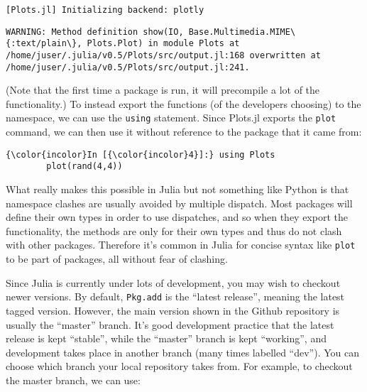 \documentclass[11pt]{article}
\begin{document}
    
    
    \begin{Verbatim}[commandchars=\\\{\}]
[Plots.jl] Initializing backend: plotly

    \end{Verbatim}

    \begin{Verbatim}[commandchars=\\\{\}]
WARNING: Method definition show(IO, Base.Multimedia.MIME\{:text/plain\}, Plots.Plot) in module Plots at /home/juser/.julia/v0.5/Plots/src/output.jl:168 overwritten at /home/juser/.julia/v0.5/Plots/src/output.jl:241.

    \end{Verbatim}

    (Note that the first time a package is run, it will precompile a lot of
the functionality.) To instead export the functions (of the developers
choosing) to the namespace, we can use the \texttt{using} statement.
Since Plots.jl exports the \texttt{plot} command, we can then use it
without reference to the package that it came from:

    \begin{Verbatim}[commandchars=\\\{\}]
{\color{incolor}In [{\color{incolor}4}]:} using Plots
        plot(rand(4,4))
\end{Verbatim}

    What really makes this possible in Julia but not something like Python
is that namespace clashes are usually avoided by multiple dispatch. Most
packages will define their own types in order to use dispatches, and so
when they export the functionality, the methods are only for their own
types and thus do not clash with other packages. Therefore it's common
in Julia for concise syntax like \texttt{plot} to be part of packages,
all without fear of clashing.

Since Julia is currently under lots of development, you may wish to
checkout newer versions. By default, \texttt{Pkg.add} is the ``latest
release'', meaning the latest tagged version. However, the main version
shown in the Github repository is usually the ``master'' branch. It's
good development practice that the latest release is kept ``stable'',
while the ``master'' branch is kept ``working'', and development takes
place in another branch (many times labelled ``dev''). You can choose
which branch your local repository takes from. For example, to checkout
the master branch, we can use:
\end{document}
